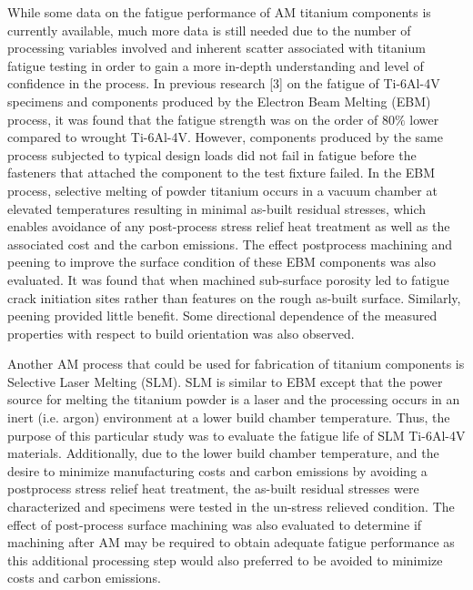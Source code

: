 \documentclass[10pt]{article}
\begin{document}
While some data on the fatigue performance of AM titanium components is currently available, much more data is still needed due to the number of processing variables involved and inherent scatter associated with titanium fatigue testing in order to gain a more in-depth understanding and level of confidence in the process. In previous research [3] on the fatigue of Ti-6Al-4V specimens and components produced by the Electron Beam Melting (EBM) process, it was found that the fatigue strength was on the order of $80 \%$ lower compared to wrought Ti-6Al-4V. However, components produced by the same process subjected to typical design loads did not fail in fatigue before the fasteners that attached the component to the test fixture failed. In the EBM process, selective melting of powder titanium occurs in a vacuum chamber at elevated temperatures resulting in minimal as-built residual stresses, which enables avoidance of any post-process stress relief heat treatment as well as the associated cost and the carbon emissions. The effect postprocess machining and peening to improve the surface condition of these EBM components was also evaluated. It was found that when machined sub-surface porosity led to fatigue crack initiation sites rather than features on the rough as-built surface. Similarly, peening provided little benefit. Some directional dependence of the measured properties with respect to build orientation was also observed.

Another AM process that could be used for fabrication of titanium components is Selective Laser Melting (SLM). SLM is similar to EBM except that the power source for melting the titanium powder is a laser and the processing occurs in an inert (i.e. argon) environment at a lower build chamber temperature. Thus, the purpose of this particular study was to evaluate the fatigue life of SLM Ti-6Al-4V materials. Additionally, due to the lower build chamber temperature, and the desire to minimize manufacturing costs and carbon emissions by avoiding a postprocess stress relief heat treatment, the as-built residual stresses were characterized and specimens were tested in the un-stress relieved condition. The effect of post-process surface machining was also evaluated to determine if machining after AM may be required to obtain adequate fatigue performance as this additional processing step would also preferred to be avoided to minimize costs and carbon emissions.
\end{document}
